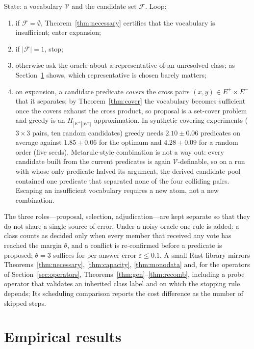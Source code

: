 \documentclass[11pt]{article}
\newcommand{\Vocab}{\mathcal{V}}
\newcommand{\Epos}{E^{+}}
\newcommand{\Eneg}{E^{-}}
\begin{document}
State: a vocabulary $\Vocab$ and the candidate set $\mathcal{F}$. Loop:
\begin{enumerate}
  \item if $\mathcal{F} = \emptyset$, Theorem~\ref{thm:necessary} certifies that the vocabulary is
        insufficient; enter expansion;
  \item if $|\mathcal{F}| = 1$, stop;
  \item otherwise ask the oracle about a representative of an unresolved class; as Section~\ref{sec:experiments} shows, which
        representative is chosen barely matters;
  \item on expansion, a candidate predicate \emph{covers} the cross pairs $(x,y) \in \Epos \times
        \Eneg$ that it separates; by Theorem~\ref{thm:cover} the vocabulary becomes sufficient once
        the covers exhaust the cross product, so proposal is a set-cover problem and greedy is an
        $H_{|\Epos||\Eneg|}$ approximation. In synthetic covering experiments ($3\times3$ pairs,
        ten random candidates) greedy needs $2.10 \pm 0.06$ predicates on average against
        $1.85 \pm 0.06$ for the optimum and $4.28 \pm 0.09$ for a random order (five seeds).
        Metarule-style combination is not a way out: every
        candidate built from the current predicates is again $\Vocab$-definable, so on a run with
        whose only predicate halved its argument, the derived candidate pool contained one predicate that
        separated none of the four colliding pairs. Escaping an insufficient vocabulary requires a
        new atom, not a new combination.
\end{enumerate}
The three roles---proposal, selection, adjudication---are kept separate so that they do not
share a single source of error. Under a noisy oracle one rule is added: a class counts as decided
only when every member that received any vote has reached the margin $\theta$, and a conflict is
re-confirmed before a predicate is proposed; $\theta = 3$ suffices for per-answer error
$\varepsilon \le 0.1$. A small Rust library mirrors Theorems~\ref{thm:necessary}, \ref{thm:capacity}, \ref{thm:monodata}
and, for the operators of Section~\ref{sec:operators}, Theorems~\ref{thm:gen}--\ref{thm:recomb}, including
a probe operator that validates an inherited class label and on which the stopping rule depends;
Its scheduling comparison reports the cost difference as the number of skipped
steps.

\section{Empirical results}\label{sec:experiments}
\end{document}
